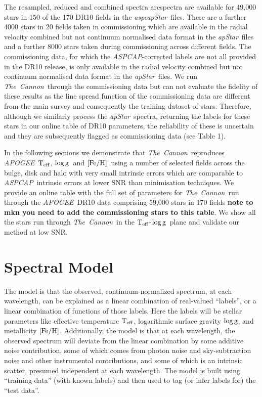 \documentclass[12pt, preprint]{aastex}
\newcommand{\teff}{\mbox{$\rm T_{eff}$}}
\newcommand{\feh}{\mbox{$\rm [Fe/H]$}}
\newcommand{\logg}{\mbox{$\rm \log g$}}
\newcommand{\tc}{\textsl{The~Cannon}}
\newcommand{\apogee}{\textsl{APOGEE}}
\newcommand{\aspcap}{\textsl{ASPCAP}}
\newcommand{\aspcapstar}{\textsl{aspcapStar}}
\newcommand{\apstar}{\textsl{apStar}}
\begin{document}
The resampled, reduced and combined spectra arespectra are available for 49,000 stars in 150 of the 170 DR10 fields in the \aspcapstar\ files. There are a further 4000 stars in 20 fields taken in commissioning which are available in the radial velocity combined but not continuum normalised data format in the \apstar\ files and a further 8000 stars taken during commissioning across different fields. 
The commissioning data, for which the \aspcap-corrected labels are not all provided in the DR10 release, is only available in the radial velocity combined but not continuum normalised data format in the \apstar\ files. 
We run \tc\ through the commissioning data but can not evaluate the fidelity of these results as the line spread function of the commissioning data are different from the main survey and consequently the training dataset of stars. 
Therefore, although we similarly process the \apstar\ spectra, returning the labels for these stars in our online table of DR10 parameters, the reliability of these is uncertain and they are subsequently flagged as commissioning data (see Table 1).


In the following sections we demonstrate that \tc\ reproduces \apogee\ \teff, \logg\ and \feh\ using a number of selected fields across the bulge, disk and halo with very small intrinsic errors which are comparable to \aspcap\ intrinsic errors at lower SNR than minimisation techniques. 
We provide an online table with the full set of parameters for \tc\ run through the \apogee\ DR10 data comprising 59,000 stars in 170 fields \textbf{note to mkn you need to add the commissioning stars to this table}.  
We show all the stars run through \tc\ in the \teff-\logg\ plane and validate our method at low SNR.




\section{Spectral Model}
\label{sec:spectralmodel}

The model is that the observed, continuum-normalized spectrum, at each
wavelength, can be explained as a linear combination of real-valued
``labels'', or a linear combination of functions of those labels.
Here the labels will be stellar parameters like effective temperature $\teff$,
logarithmic surface gravity $\logg$, and metallicity $\feh$.
Additionally, the model is that at each wavelength, the observed
spectrum will deviate from the linear combination by some additive
noise contribution, some of which comes from photon noise and
sky-subtraction noise and other instrumental contributions, and some
of which is an intrinsic scatter, presumed independent at each
wavelength.
The model is built using ``training data'' (with known labels) and then
used to tag (or infer labels for) the ``test data''.
\end{document}
